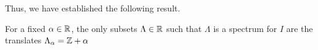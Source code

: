 \documentclass[../thesis.tex]{subfiles}
\begin{document}
Thus, we have established the following result.
\begin{proposition}
    For a fixed $\alpha \in \mathbb{R}$, the only subsets $\Lambda \in \mathbb{R}$ such that $\Lambda$ is a spectrum for $I$ are the translates $\Lambda_\alpha = \mathbb{Z} + \alpha$
\end{proposition}
%
\end{document}
